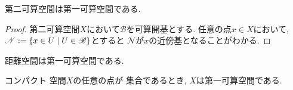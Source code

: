 \documentclass[uplatex, dvipdfmx, a4paper, 12pt, class=jsbook, crop=false]{standalone}
\begin{document}
\begin{proposition}
	第二可算空間は第一可算空間である.
\end{proposition}

\begin{proof}
	第二可算空間$ X $において$ \mathscr{B} $を可算開基とする.
	任意の点$ x \in X $において, $ \mathscr{N} \defeq \setcomp{x \in U}{U \in \mathscr{B}} $とすると
	$ \mathscr{N} $が$ x $の近傍基となることがわかる.
\end{proof}

\begin{proposition}
	距離空間は第一可算空間である.
\end{proposition}

\begin{proposition}
	コンパクト \Hausdorff 空間$ X $の任意の点が \Gdelta 集合であるとき,
	$ X $は第一可算空間である.
\end{proposition}
\end{document}
